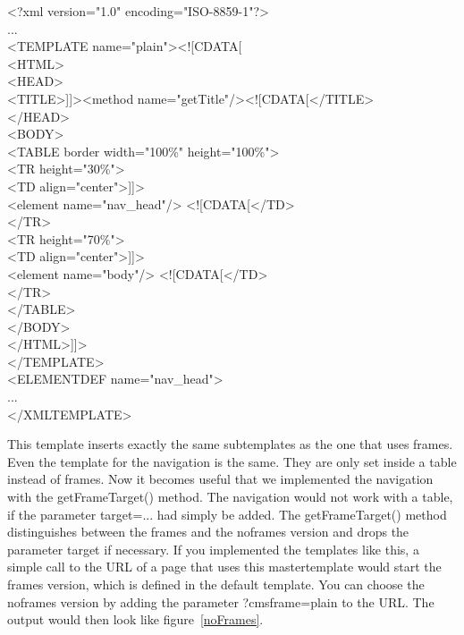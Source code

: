 \begin{xml}
<?xml version="1.0" encoding="ISO-8859-1"?>\\
...\\
<TEMPLATE name="plain"><![CDATA[\\
<HTML> \\
<HEAD>\\
\xtaba <TITLE>]]><method name="getTitle"/><![CDATA[</TITLE>\\
</HEAD>\\
<BODY>\\
\xtaba <TABLE border width="100\%" height="100\%">\\
\xtaba   <TR height="30\%">\\
\xtabb             <TD align="center">]]> \\
\xtabb              <element name="nav\_head"/> <![CDATA[</TD>\\
\xtaba   </TR>\\
\xtaba   <TR height="70\%">\\
\xtabb             <TD align="center">]]>\\
\xtabb              <element name="body"/> <![CDATA[</TD>\\
\xtaba   </TR>\\
\xtaba </TABLE>\\
</BODY>\\
</HTML>]]>\\
</TEMPLATE>\\

<ELEMENTDEF name="nav\_head">\\
...\\
</XMLTEMPLATE>\\
\end{xml}

This template inserts exactly the same subtemplates as the one that uses frames. Even the
template for the navigation is the same. They are only set inside a table instead of frames.
Now it becomes useful that we implemented the navigation with the {\meth getFrameTarget()} 
method.
The navigation would not work with a table, if the parameter {\tag target=...} had
simply be added. The {\meth getFrameTarget()} method distinguishes between the frames and
the noframes version and drops the parameter {\name target} if necessary. 
If you implemented the templates like this, a simple call to the URL of a page that 
uses this mastertemplate would start the frames version, which is defined in
the default template. 
You can choose the noframes version by adding the parameter {\name ?cmsframe=plain}
to the URL. The output would then look like figure~\ref{noFrames}.

